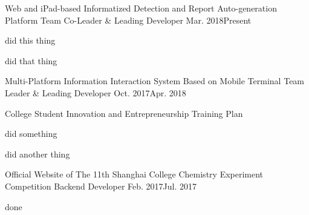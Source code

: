 
\begin{projitem}
    {Web and iPad-based Informatized Detection and Report Auto-generation Platform}
    {Team Co-Leader \& Leading Developer}
    {Mar. 2018}{Present}
    \item did this thing
    \item did that thing
\end{projitem}

\begin{projitem}
    {Multi-Platform Information Interaction System Based on Mobile Terminal}
    {Team Leader \& Leading Developer}
    {Oct. 2017}{Apr. 2018}
    \item College Student Innovation and Entrepreneurship Training Plan
    \item did something
    \item did another thing
\end{projitem}

\begin{projitem}
    {Official Website of The 11th Shanghai College Chemistry Experiment Competition}
    {Backend Developer}
    {Feb. 2017}{Jul. 2017}
    \item done
\end{projitem}

\endinput